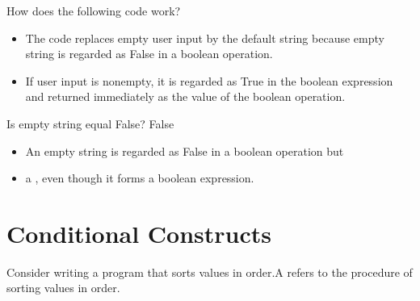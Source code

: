 \documentclass[letterpaper,10pt,english]{sphinxmanual}
\begin{document}
 How does the following code work?

\begin{sphinxVerbatim}[commandchars=\\\{\}]
   
\end{sphinxVerbatim}
\begin{itemize}
\item {} 
The code replaces empty user input by the default string  because empty string is regarded as False in a boolean operation.

\item {} 
If user input is non\sphinxhyphen{}empty, it is regarded as True in the boolean expression and returned immediately as the value of the boolean operation.

\end{itemize}


\begin{sphinxVerbatim}[commandchars=\\\{\}]
\end{sphinxVerbatim}

\begin{sphinxVerbatim}[commandchars=\\\{\}]
Is empty string equal False? False
\end{sphinxVerbatim}
\begin{itemize}
\item {} 
An empty string is regarded as False in a boolean operation but

\item {} 
a , even though it forms a boolean expression.

\end{itemize}


\section{Conditional Constructs}
\label{\detokenize{Lecture3/Conditional Execution:conditional-constructs}}
Consider writing a program that sorts values in  order.A  refers to the procedure of sorting values in order.
\end{document}
